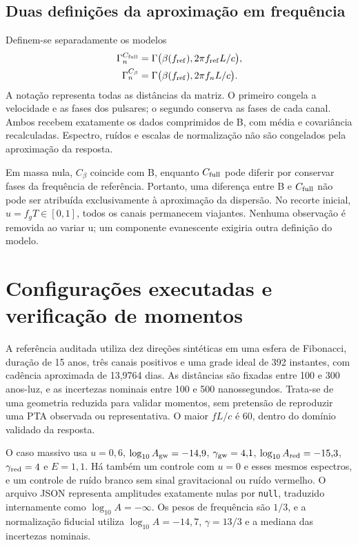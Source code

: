 \subsection{Duas definições da aproximação em frequência}

Definem-se separadamente os modelos
\begin{align}
 \Gamma^{C_{\rm full}}_n
 &=\Gamma\bigl(\beta(f_{\rm ref}),2\pi f_{\rm ref}L/c\bigr),
 \label{eq:sim-cfull}\\
 \Gamma^{C_\beta}_n
 &=\Gamma\bigl(\beta(f_{\rm ref}),2\pi f_nL/c\bigr).
 \label{eq:sim-cbeta}
\end{align}
A notação representa todas as distâncias da matriz. O primeiro congela a
velocidade e as fases dos pulsares; o segundo conserva as fases de cada
canal. Ambos recebem exatamente os dados comprimidos de B, com média e
covariância recalculadas. Espectro, ruídos e escalas de normalização não
são congelados pela aproximação da resposta.

Em massa nula, \(C_\beta\) coincide com B, enquanto
\(C_{\rm full}\) pode diferir por conservar fases da frequência de
referência. Portanto, uma diferença entre B e \(C_{\rm full}\) não
pode ser atribuída exclusivamente à aproximação da dispersão. No
recorte inicial, \(u=f_gT\in[0,1]\), todos os canais permanecem
viajantes. Nenhuma observação é removida ao variar u; um componente
evanescente exigiria outra definição do modelo.

\section{Configurações executadas e verificação de momentos}

A referência auditada utiliza dez direções sintéticas em uma esfera de
Fibonacci, duração de 15 anos, três canais positivos e uma grade ideal
de 392 instantes, com cadência aproximada de 13,9764 dias. As distâncias
são fixadas entre 100 e 300 anos-luz, e as incertezas nominais entre 100
e 500 nanossegundos. Trata-se de uma geometria reduzida para validar
momentos, sem pretensão de reproduzir uma PTA observada ou
representativa. O maior \(fL/c\) é 60, dentro do domínio validado da resposta.

O caso massivo usa \(u=0{,}6\),
\(\log_{10}A_{\rm gw}=-14{,}9\), \(\gamma_{\rm gw}=4{,}1\),
\(\log_{10}A_{\rm red}=-15{,}3\), \(\gamma_{\rm red}=4\)
e \(E=1{,}1\). Há também um controle com \(u=0\) e esses mesmos
espectros, e um controle de ruído branco sem sinal gravitacional ou
ruído vermelho. O arquivo JSON representa amplitudes exatamente nulas
por \texttt{null}, traduzido internamente como
\(\log_{10}A=-\infty\). Os pesos de frequência são \(1/3\), e a
normalização fiducial utiliza \(\log_{10}A=-14{,}7\),
\(\gamma=13/3\) e a mediana das incertezas nominais.

